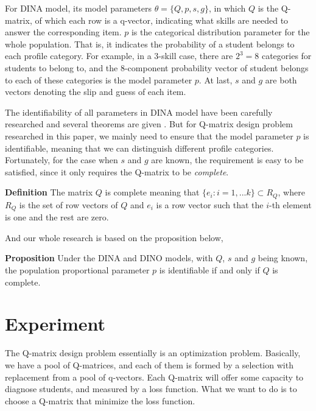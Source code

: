 \documentclass{edm_template}
\begin{document}
For DINA model, its model parameters $\theta = \{Q, p, s, g\}$, in which $Q$ is the Q-matrix, of which each row is a q-vector, indicating what skills are needed to answer the corresponding item. $p$ is the categorical distribution parameter for the whole population. That is, it indicates the probability of a student belongs to each profile category. For example, in a 3-skill case, there are $2^3=8$ categories for students to belong to, and the 8-component probability vector of student belongs to each of these categories is the model parameter $p$. At last, $s$ and $g$ are both vectors denoting the slip and guess of each item. 

The identifiability of all parameters in DINA model have been carefully researched and several theorems are given \cite{xu2015identifiability}. But for Q-matrix design problem researched in this paper, we mainly need to ensure that the model parameter $p$ is identifiable, meaning that we can distinguish different profile categories. Fortunately, for the case when $s$ and $g$ are known, the requirement is easy to be satisfied, since it only requires the Q-matrix to be \textit{complete}.

\textbf{Definition} \cite{xu2015identifiability}  The matrix $Q$ is complete meaning that $\{e_{i}:i=1,...k\} \subset R_{Q}$, where $R_{Q}$ is the set of row vectors of $Q$ and $e_{i}$ is a row vector such that the $i$-th element is one and the rest are zero.

And our whole research is based on the proposition below,

\textbf{Proposition} \cite{xu2015identifiability} Under the DINA and DINO models, with $Q$, $s$ and $g$ being known, the population proportional parameter $p$ is identifiable if and only if $Q$ is complete.

   
%


\section{Experiment}
The Q-matrix design problem essentially is an optimization problem. Basically, we have a pool of Q-matrices, and each of them is formed by a selection with replacement from a pool of q-vectors. Each Q-matrix will offer some capacity to diagnose students, and measured by a loss function. What we want to do is to choose a Q-matrix that minimize the loss function.
\end{document}

